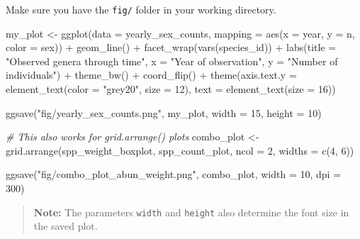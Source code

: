 \documentclass[
]{article}
\newenvironment{Shaded}{\begin{snugshade}}{\end{snugshade}}
\newcommand{\AttributeTok}[1]{\textcolor[rgb]{0.77,0.63,0.00}{#1}}
\newcommand{\CommentTok}[1]{\textcolor[rgb]{0.56,0.35,0.01}{\textit{#1}}}
\newcommand{\DecValTok}[1]{\textcolor[rgb]{0.00,0.00,0.81}{#1}}
\newcommand{\FunctionTok}[1]{\textcolor[rgb]{0.00,0.00,0.00}{#1}}
\newcommand{\NormalTok}[1]{#1}
\newcommand{\OtherTok}[1]{\textcolor[rgb]{0.56,0.35,0.01}{#1}}
\newcommand{\SpecialCharTok}[1]{\textcolor[rgb]{0.00,0.00,0.00}{#1}}
\newcommand{\StringTok}[1]{\textcolor[rgb]{0.31,0.60,0.02}{#1}}
\begin{document}
Make sure you have the \texttt{fig/} folder in your working directory.

\begin{Shaded}
\begin{Highlighting}[]
\NormalTok{my\_plot }\OtherTok{\textless{}{-}} \FunctionTok{ggplot}\NormalTok{(}\AttributeTok{data =}\NormalTok{ yearly\_sex\_counts, }
                  \AttributeTok{mapping =} \FunctionTok{aes}\NormalTok{(}\AttributeTok{x =}\NormalTok{ year, }\AttributeTok{y =}\NormalTok{ n, }\AttributeTok{color =}\NormalTok{ sex)) }\SpecialCharTok{+}
  \FunctionTok{geom\_line}\NormalTok{() }\SpecialCharTok{+}
  \FunctionTok{facet\_wrap}\NormalTok{(}\FunctionTok{vars}\NormalTok{(species\_id)) }\SpecialCharTok{+}
  \FunctionTok{labs}\NormalTok{(}\AttributeTok{title =} \StringTok{"Observed genera through time"}\NormalTok{,}
       \AttributeTok{x =} \StringTok{"Year of observation"}\NormalTok{,}
       \AttributeTok{y =} \StringTok{"Number of individuals"}\NormalTok{) }\SpecialCharTok{+}
  \FunctionTok{theme\_bw}\NormalTok{() }\SpecialCharTok{+}
  \FunctionTok{coord\_flip}\NormalTok{() }\SpecialCharTok{+} 
  \FunctionTok{theme}\NormalTok{(}\AttributeTok{axis.text.y =} \FunctionTok{element\_text}\NormalTok{(}\AttributeTok{color =} \StringTok{"grey20"}\NormalTok{, }\AttributeTok{size =} \DecValTok{12}\NormalTok{),}
        \AttributeTok{text =} \FunctionTok{element\_text}\NormalTok{(}\AttributeTok{size =} \DecValTok{16}\NormalTok{))}

\FunctionTok{ggsave}\NormalTok{(}\StringTok{"fig/yearly\_sex\_counts.png"}\NormalTok{, my\_plot, }\AttributeTok{width =} \DecValTok{15}\NormalTok{, }\AttributeTok{height =} \DecValTok{10}\NormalTok{)}

\CommentTok{\# This also works for grid.arrange() plots}
\NormalTok{combo\_plot }\OtherTok{\textless{}{-}} \FunctionTok{grid.arrange}\NormalTok{(spp\_weight\_boxplot, spp\_count\_plot, }
                           \AttributeTok{ncol =} \DecValTok{2}\NormalTok{, }\AttributeTok{widths =} \FunctionTok{c}\NormalTok{(}\DecValTok{4}\NormalTok{, }\DecValTok{6}\NormalTok{))}

\FunctionTok{ggsave}\NormalTok{(}\StringTok{"fig/combo\_plot\_abun\_weight.png"}\NormalTok{, combo\_plot, }\AttributeTok{width =} \DecValTok{10}\NormalTok{, }\AttributeTok{dpi =} \DecValTok{300}\NormalTok{)}
\end{Highlighting}
\end{Shaded}

\begin{quote}
\textbf{Note:} The parameters \texttt{width} and \texttt{height} also
determine the font size in the saved plot.
\end{quote}
\end{document}
